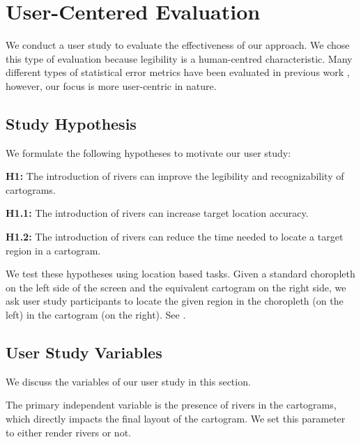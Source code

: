 \newcommand{\pCount}{24 }
\section{User-Centered Evaluation}

We conduct a user study to evaluate the effectiveness of our approach. We chose this type of evaluation because legibility is a human-centred characteristic. Many different types of statistical error metrics have been evaluated in previous work \cite{nusrat2016State}, however, our focus is more user-centric in nature.

\subsection{Study Hypothesis}

We formulate the following hypotheses to motivate our user study:

\textbf{H1:} The introduction of rivers can improve the legibility and recognizability of cartograms.

\textbf{H1.1:} The introduction of rivers can increase target location accuracy.

\textbf{H1.2:} The introduction of rivers can reduce the time needed to locate a target region in a cartogram.

We test these hypotheses using location based tasks. Given a standard choropleth on the left side of the screen and the equivalent cartogram on the right side, we ask user study participants to locate the given region in the choropleth (on the left) in the cartogram (on the right). See .

\subsection{User Study Variables}

We discuss the variables of our user study in this section.

The primary independent variable is the presence of rivers in the cartograms, which directly impacts the final layout of the cartogram. We set this parameter to either render rivers or not.



